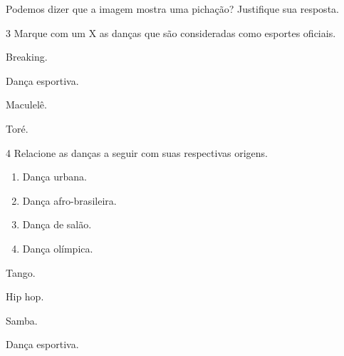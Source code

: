 Podemos dizer que a imagem mostra uma pichação? Justifique sua resposta.




\num{3}  Marque com um X as danças que são consideradas como esportes oficiais.

\begin{boxlist}
 Breaking.

 Dança esportiva.

 Maculelê.

 Toré.
\end{boxlist}


\num{4}  Relacione as danças a seguir com suas respectivas origens.

\begin{multicols}{2}  
\begin{enumerate}
\item Dança urbana.

\item Dança afro-brasileira.

\item Dança de salão.

\item Dança olímpica.
\end{enumerate}
\end{multicols}

\begin{boxlist}
 Tango.

 Hip hop.

 Samba.

 Dança esportiva.
\end{boxlist}


